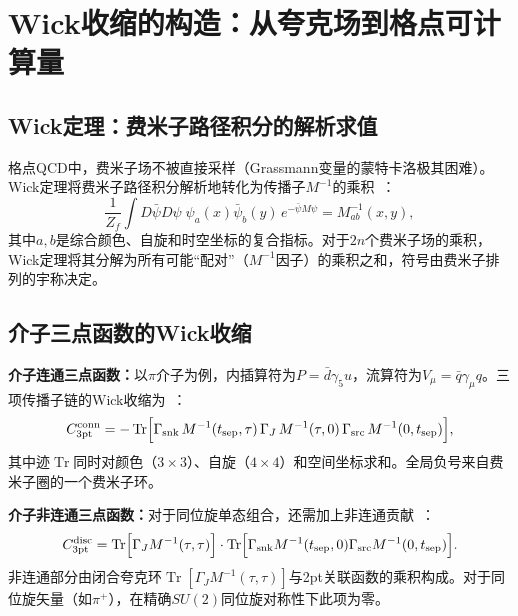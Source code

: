 \documentclass[12pt,a4paper]{ctexart}
\theoremstyle{definition}
\begin{document}
\section{Wick收缩的构造：从夸克场到格点可计算量}

\subsection{Wick定理：费米子路径积分的解析求值}

格点QCD中，费米子场不被直接采样（Grassmann变量的蒙特卡洛极其困难）。Wick定理将费米子路径积分解析地转化为传播子$M^{-1}$的乘积~\cite{GattringerLang2010,wickContraction2026}：
\begin{equation}\label{eq:wick_theorem}
    \frac{1}{Z_f} \int D\bar{\psi}D\psi\; \psi_a(x)\bar{\psi}_b(y)\, e^{-\bar{\psi}M\psi} = M^{-1}_{ab}(x,y),
\end{equation}
其中$a,b$是综合颜色、自旋和时空坐标的复合指标。对于$2n$个费米子场的乘积，Wick定理将其分解为所有可能``配对''（$M^{-1}$因子）的乘积之和，符号由费米子排列的宇称决定。

\subsection{介子三点函数的Wick收缩}

\textbf{介子连通三点函数：}以$\pi$介子为例，内插算符为$P = \bar{d}\gamma_5 u$，流算符为$V_\mu = \bar{q}\gamma_\mu q$。三项传播子链的Wick收缩为~\cite{wickContraction2026}：
\begin{equation}\label{eq:meson_wick}
    C_{3\text{pt}}^{\text{conn}} = -\operatorname{Tr}\Bigl[ \Gamma_{\text{snk}}\,M^{-1}(t_{\text{sep}},\tau)\,\Gamma_J\,M^{-1}(\tau,0)\,\Gamma_{\text{src}}\,M^{-1}(0,t_{\text{sep}}) \Bigr],
\end{equation}
其中迹$\operatorname{Tr}$同时对颜色（$3\times3$）、自旋（$4\times4$）和空间坐标求和。全局负号来自费米子圈的一个费米子环。

\textbf{介子非连通三点函数：}对于同位旋单态组合，还需加上非连通贡献~\cite{wickContraction2026}：
\begin{equation}
    C_{3\text{pt}}^{\text{disc}} = \operatorname{Tr}\Bigl[ \Gamma_J M^{-1}(\tau,\tau) \Bigr] \cdot
    \operatorname{Tr}\Bigl[ \Gamma_{\text{snk}} M^{-1}(t_{\text{sep}},0) \Gamma_{\text{src}} M^{-1}(0,t_{\text{sep}}) \Bigr].
\end{equation}
非连通部分由闭合夸克环$\operatorname{Tr}[\Gamma_J M^{-1}(\tau,\tau)]$与2pt关联函数的乘积构成。对于同位旋矢量（如$\pi^+$），在精确$SU(2)$同位旋对称性下此项为零。
\end{document}
